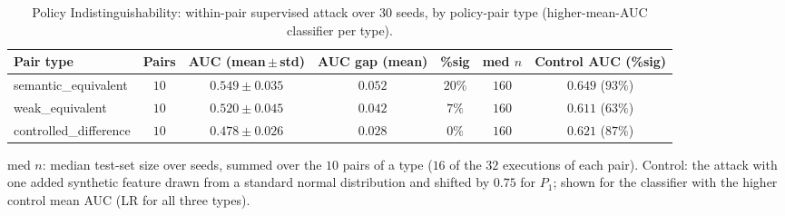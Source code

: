 \begin{table}[htbp]
	\caption{Policy Indistinguishability: within-pair supervised attack over 30 seeds, by
		policy-pair type (higher-mean-AUC classifier per type).}
	\label{tab:pi-pairs}
	\centering\footnotesize
	\begin{tabular}{lcccccc}
		\toprule
		Pair type              & Pairs & AUC (mean\,$\pm$\,std) & AUC gap (mean) & \%sig  & med $n$ & Control AUC (\%sig) \\
		\midrule
		semantic\_equivalent   & $10$  & $0.549 \pm 0.035$      & $0.052$        & $20\%$ & $160$   & $0.649$ ($93\%$)    \\
		weak\_equivalent       & $10$  & $0.520 \pm 0.045$      & $0.042$        & $7\%$  & $160$   & $0.611$ ($63\%$)    \\
		controlled\_difference & $10$  & $0.478 \pm 0.026$      & $0.028$        & $0\%$  & $160$   & $0.621$ ($87\%$)    \\
		\bottomrule
	\end{tabular}

	\begin{tablenote}
		med $n$: median test-set size over seeds, summed over the $10$ pairs of a type ($16$ of the $32$ executions of each pair). Control: the attack with one added synthetic feature drawn from a standard normal distribution and shifted by $0.75$ for $P_1$; shown for the classifier with the higher control mean AUC (LR for all three types).
	\end{tablenote}
\end{table}
